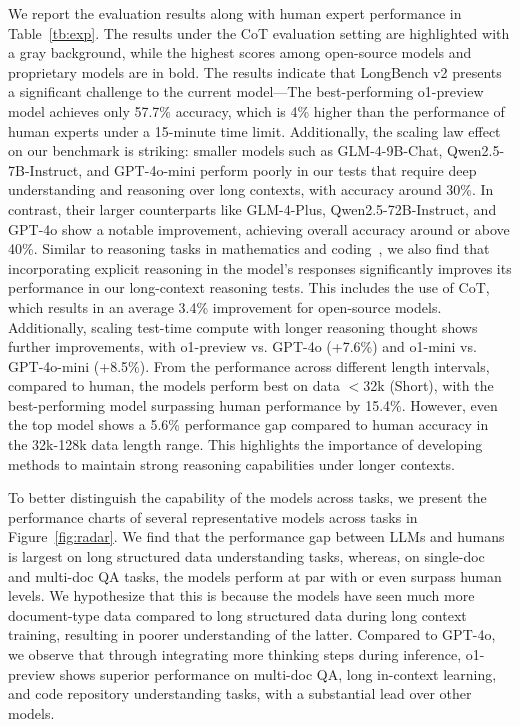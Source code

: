 We report the evaluation results along with human expert performance in Table~\ref{tb:exp}. The results under the CoT evaluation setting are highlighted with a gray background, while the highest scores among open-source models and proprietary models are in bold.
The results indicate that LongBench v2 presents a significant challenge to the current model---The best-performing o1-preview model achieves only 57.7\% accuracy, which is 4\% higher than the performance of human experts under a 15-minute time limit. Additionally, the scaling law effect on our benchmark is striking: smaller models such as GLM-4-9B-Chat, Qwen2.5-7B-Instruct, and GPT-4o-mini perform poorly in our tests that require deep understanding and reasoning over long contexts, with accuracy around 30\%. In contrast, their larger counterparts like GLM-4-Plus, Qwen2.5-72B-Instruct, and GPT-4o show a notable improvement, achieving overall accuracy around or above 40\%.
Similar to reasoning tasks in mathematics and coding~\cite{wei2022chain,sprague2024cot,o1-preview}, we also find that incorporating explicit reasoning in the model’s responses significantly improves its performance in our long-context reasoning tests.
This includes the use of CoT, which results in an average 3.4\% improvement for open-source models. Additionally, scaling test-time compute with longer reasoning thought shows further improvements, with o1-preview vs. GPT-4o (+7.6\%) and o1-mini vs. GPT-4o-mini (+8.5\%).
From the performance across different length intervals, compared to human, the models perform best on data $<$32k (Short), with the best-performing model surpassing human performance by 15.4\%. However, even the top model shows a 5.6\% performance gap compared to human accuracy in the 32k-128k data length range. This highlights the importance of developing methods to maintain strong reasoning capabilities under longer contexts.

To better distinguish the capability of the models across tasks, we present the performance charts of several representative models across tasks in Figure~\ref{fig:radar}.
We find that the performance gap between LLMs and humans is largest on long structured data understanding tasks, whereas, on single-doc and multi-doc QA tasks, the models perform at par with or even surpass human levels.
We hypothesize that this is because the models have seen much more document-type data compared to long structured data during long context training, resulting in poorer understanding of the latter.
Compared to GPT-4o, we observe that through integrating more thinking steps during inference, o1-preview shows superior performance on multi-doc QA, long in-context learning, and code repository understanding tasks, with a substantial lead over other models.

